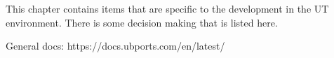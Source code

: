 This chapter contains items that are specific to the development in the UT environment. There is some decision making that is listed here.


General docs:
https://docs.ubports.com/en/latest/






